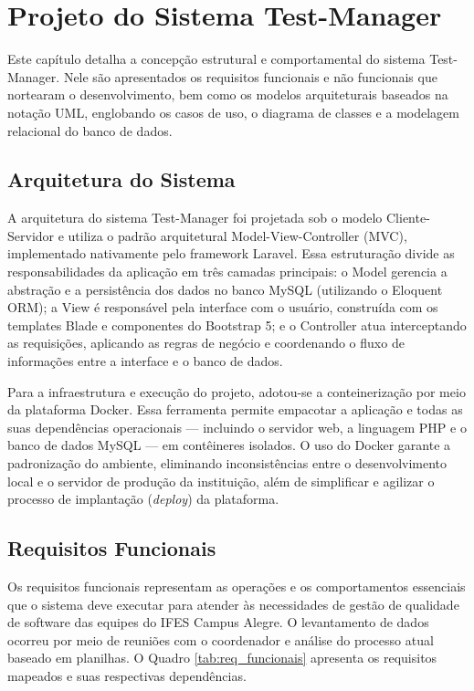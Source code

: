 \chapter{Projeto do Sistema Test-Manager}

Este capítulo detalha a concepção estrutural e comportamental do sistema Test-Manager. Nele são apresentados os requisitos funcionais e não funcionais que nortearam o desenvolvimento, bem como os modelos arquiteturais baseados na notação UML, englobando os casos de uso, o diagrama de classes e a modelagem relacional do banco de dados.

\section{Arquitetura do Sistema}

A arquitetura do sistema Test-Manager foi projetada sob o modelo Cliente-Servidor e utiliza o padrão arquitetural Model-View-Controller (MVC), implementado nativamente pelo framework Laravel. Essa estruturação divide as responsabilidades da aplicação em três camadas principais: o Model gerencia a abstração e a persistência dos dados no banco MySQL (utilizando o Eloquent ORM); a View é responsável pela interface com o usuário, construída com os templates Blade e componentes do Bootstrap 5; e o Controller atua interceptando as requisições, aplicando as regras de negócio e coordenando o fluxo de informações entre a interface e o banco de dados.

Para a infraestrutura e execução do projeto, adotou-se a conteinerização por meio da plataforma Docker. Essa ferramenta permite empacotar a aplicação e todas as suas dependências operacionais --- incluindo o servidor web, a linguagem PHP e o banco de dados MySQL --- em contêineres isolados. O uso do Docker garante a padronização do ambiente, eliminando inconsistências entre o desenvolvimento local e o servidor de produção da instituição, além de simplificar e agilizar o processo de implantação (\textit{deploy}) da plataforma.

\section{Requisitos Funcionais}

Os requisitos funcionais representam as operações e os comportamentos essenciais que o sistema deve executar para atender às necessidades de gestão de qualidade de software das equipes do IFES Campus Alegre. O levantamento de dados ocorreu por meio de reuniões com o coordenador e análise do processo atual baseado em planilhas. O Quadro \ref{tab:req_funcionais} apresenta os requisitos mapeados e suas respectivas dependências.

